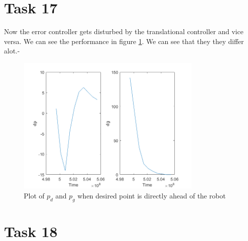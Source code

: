 \documentclass[a4paper,12pt,oneside,onecolumn]{article} %
\begin{document}
\section*{Task 17}
Now the error controller gets disturbed by the translational controller and vice versa. We can see the performance in figure \ref{17}.  We can see that they they differ alot.-
\begin{figure}[H]
\begin{center}	
  \includegraphics[width = 0.8\textwidth]{task17.png}
  \caption{Plot of  $p_d$ and $p_g$ when desired point is directly ahead of the robot}\label{17}
 \end{center}
\end{figure}


\section*{Task 18}
\end{document}
